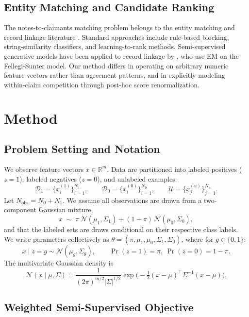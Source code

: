 \documentclass[11pt]{article}
\theoremstyle{definition}
\newcommand{\R}{\mathbb{R}}
\newcommand{\calD}{\mathcal{D}}
\newcommand{\calU}{\mathcal{U}}
\newcommand{\calN}{\mathcal{N}}
\newcommand{\Sig}{\Sigma}
\begin{document}
\subsection{Entity Matching and Candidate Ranking}

The notes-to-claimants matching problem belongs to the entity matching
and record linkage literature \citep{fellegi1969theory, christophides2020overview}.
Standard approaches include rule-based blocking, string-similarity
classifiers, and learning-to-rank methods.
Semi-supervised generative models have been applied to record linkage
by \citet{larsen2001iterative}, who use EM on the Fellegi-Sunter model.
Our method differs in operating on arbitrary numeric feature vectors
rather than agreement patterns, and in explicitly modeling within-claim
competition through post-hoc score renormalization.


\section{Method}
\label{sec:method}

\subsection{Problem Setting and Notation}

We observe feature vectors \(x\in\R^m\).
Data are partitioned into labeled positives (\(z=1\)), labeled negatives (\(z=0\)),
and unlabeled examples:
\[
\calD_1=\{x_i^{(1)}\}_{i=1}^{N_1},\qquad
\calD_0=\{x_i^{(0)}\}_{i=1}^{N_0},\qquad
\calU=\{x_j^{(u)}\}_{j=1}^{N_u}.
\]
Let \(N_{\mathrm{obs}}=N_0+N_1\).
We assume all observations are drawn from a two-component Gaussian mixture,
\[
x \;\sim\; \pi\,\calN(\mu_1,\Sig_1) + (1-\pi)\,\calN(\mu_0,\Sig_0),
\]
and that the labeled sets are draws conditional on their respective class
labels.
We write parameters collectively as
\(\theta=(\pi,\mu_1,\mu_0,\Sig_1,\Sig_0)\), where for \(g\in\{0,1\}\):
\[
x\mid z=g \sim \calN(\mu_g,\Sig_g),
\qquad \Pr(z=1)=\pi,\ \Pr(z=0)=1-\pi.
\]
The multivariate Gaussian density is
\[
\calN(x\mid \mu,\Sig)=\frac{1}{(2\pi)^{m/2}|\Sig|^{1/2}}
\exp\!\Big(-\tfrac{1}{2}(x-\mu)^\top\Sig^{-1}(x-\mu)\Big).
\]

\subsection{Weighted Semi-Supervised Objective}
\end{document}
